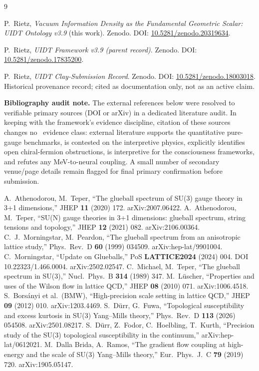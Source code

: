 \begin{thebibliography}{9}
\footnotesize

P.~Rietz, \textit{Vacuum Information Density as the Fundamental Geometric Scalar: UIDT Ontology v3.9} (this work). Zenodo. DOI: \href{https://doi.org/10.5281/zenodo.20319634}{10.5281/zenodo.20319634}.

P.~Rietz, \textit{UIDT Framework v3.9 (parent record)}. Zenodo. DOI: \href{https://doi.org/10.5281/zenodo.17835200}{10.5281/zenodo.17835200}.

P.~Rietz, \textit{UIDT Clay-Submission Record}. Zenodo. DOI: \href{https://doi.org/10.5281/zenodo.18003018}{10.5281/zenodo.18003018}. Historical provenance record; cited as documentation only, not as an active claim.

\textbf{Bibliography audit note.} The external references below were resolved to verifiable primary sources (DOI or arXiv) in a dedicated literature audit. In keeping with the framework's evidence discipline, citation of these sources changes no \UIDT\ evidence class: external literature supports the quantitative pure-gauge benchmarks, is contested on the interpretive physics, explicitly identifies open chiral-fermion obstructions, is interpretive for the consciousness frameworks, and refutes any MeV-to-neural coupling. A small number of secondary venue/page details remain flagged for final primary confirmation before submission.

A.~Athenodorou, M.~Teper, ``The glueball spectrum of SU(3) gauge theory in 3+1 dimensions,'' JHEP \textbf{11} (2020) 172. arXiv:2007.06422.
A.~Athenodorou, M.~Teper, ``SU(N) gauge theories in 3+1 dimensions: glueball spectrum, string tensions and topology,'' JHEP \textbf{12} (2021) 082. arXiv:2106.00364.
C.~J.~Morningstar, M.~Peardon, ``The glueball spectrum from an anisotropic lattice study,'' Phys.\ Rev.\ D \textbf{60} (1999) 034509. arXiv:hep-lat/9901004.
C.~Morningstar, ``Update on Glueballs,'' PoS \textbf{LATTICE2024} (2024) 004. DOI 10.22323/1.466.0004. arXiv:2502.02547.
C.~Michael, M.~Teper, ``The glueball spectrum in SU(3),'' Nucl.\ Phys.\ B \textbf{314} (1989) 347.
M.~L\"uscher, ``Properties and uses of the Wilson flow in lattice QCD,'' JHEP \textbf{08} (2010) 071. arXiv:1006.4518.
S.~Bors\'anyi et al.\ (BMW), ``High-precision scale setting in lattice QCD,'' JHEP \textbf{09} (2012) 010. arXiv:1203.4469.
S.~D\"urr, G.~Fuwa, ``Topological susceptibility and excess kurtosis in SU(3) Yang--Mills theory,'' Phys.\ Rev.\ D \textbf{113} (2026) 054508. arXiv:2501.08217.
S.~D\"urr, Z.~Fodor, C.~Hoelbling, T.~Kurth, ``Precision study of the SU(3) topological susceptibility in the continuum,'' arXiv:hep-lat/0612021.
M.~Dalla Brida, A.~Ramos, ``The gradient flow coupling at high-energy and the scale of SU(3) Yang--Mills theory,'' Eur.\ Phys.\ J.\ C \textbf{79} (2019) 720. arXiv:1905.05147.


\end{thebibliography}

